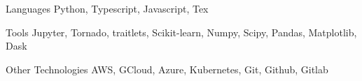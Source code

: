 
\begin{cvskills}

  \cvskill
    {Languages} %
    {Python, Typescript, Javascript, Tex} %

  \cvskill
    {Tools}
    {Jupyter, Tornado, traitlets, Scikit-learn, Numpy, Scipy, Pandas, Matplotlib, Dask}

  \cvskill
    {Other Technologies}
    {AWS, GCloud, Azure, Kubernetes, Git, Github, Gitlab}

\end{cvskills}

